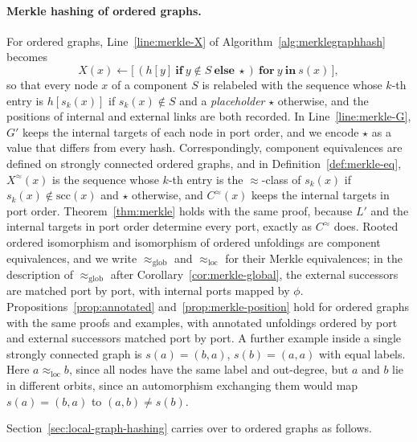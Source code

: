\documentclass[twoside,leqno]{article}
\newcommand{\eqg}{\approx_{\mathrm{glob}}}
\newcommand{\eql}{\approx_{\mathrm{loc}}}
\newcommand{\Scc}{\mathrm{scc}}
\begin{document}
\paragraph{Merkle hashing of ordered graphs.} For ordered graphs, Line~\ref{line:merkle-X} of Algorithm~\ref{alg:merklegraphhash} becomes
\[
X(x) \gets \big[\,(h[y]~\textbf{if}~y\notin S~\textbf{else}~\star)~\textbf{for}~y~\textbf{in}~s(x)\,\big],
\]
so that every node $x$ of a component $S$ is relabeled with the sequence whose $k$-th entry is $h[s_k(x)]$ if $s_k(x)\notin S$ and a \emph{placeholder} $\star$ otherwise, and the positions of internal and external links are both recorded. In Line~\ref{line:merkle-G}, $G'$ keeps the internal targets of each node in port order, and we encode $\star$ as a value that differs from every hash. Correspondingly, component equivalences are defined on strongly connected ordered graphs, and in Definition~\ref{def:merkle-eq}, $X^{\approx}(x)$ is the sequence whose $k$-th entry is the $\approx$-class of $s_k(x)$ if $s_k(x)\notin\Scc(x)$ and $\star$ otherwise, and $C^{\approx}(x)$ keeps the internal targets in port order. Theorem~\ref{thm:merkle} holds with the same proof, because $L'$ and the internal targets in port order determine every port, exactly as $C^{\approx}$ does. Rooted ordered isomorphism and isomorphism of ordered unfoldings are component equivalences, and we write $\eqg$ and $\eql$ for their Merkle equivalences; in the description of $\eqg$ after Corollary~\ref{cor:merkle-global}, the external successors are matched port by port, with internal ports mapped by $\phi$. Propositions~\ref{prop:annotated} and~\ref{prop:merkle-position} hold for ordered graphs with the same proofs and examples, with annotated unfoldings ordered by port and external successors matched port by port. A further example inside a single strongly connected graph is $s(a)=(b,a)$, $s(b)=(a,a)$ with equal labels. Here $a\eql b$, since all nodes have the same label and out-degree, but $a$ and $b$ lie in different orbits, since an automorphism exchanging them would map $s(a)=(b,a)$ to $(a,b)\ne s(b)$.

Section~\ref{sec:local-graph-hashing} carries over to ordered graphs as follows.
\end{document}
